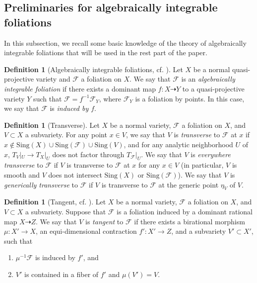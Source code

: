 \documentclass[11pt]{amsart}
\numberwithin{equation}{section}
\newcommand{\Ff}{\mathcal{F}}
\newcommand{\Sing}{\mathrm{Sing}}
\theoremstyle{definition}
\newtheorem{defn}[thm]{Definition}
\theoremstyle{definition}
\theoremstyle{definition}
\begin{document}
\subsection{Preliminaries for algebraically integrable foliations}\label{subsec: ai foliation}

In this subsection, we recall some basic knowledge of the theory of algebraically integrable foliations that will be used in the rest part of the paper.

\begin{defn}[Algebraically integrable foliations, {cf. \cite[3.1]{ACSS21}}]\label{defn: algebraically integrable}
Let $X$ be a normal quasi-projective variety and $\Ff$ a foliation on $X$. We say that $\Ff$ is an \emph{algebraically integrable foliation} if there exists a dominant map $f: X\dashrightarrow Y$ to a quasi-projective variety $Y$ such that $\Ff=f^{-1}\Ff_Y$, where $\Ff_Y$ is a foliation by points. In this case, we say that $\Ff$ is \emph{induced by $f$}.
\end{defn}


\begin{defn}[Transverse]
  Let $X$ be a normal variety, $\Ff$ a foliation on $X$, and $V\subset X$ a subvariety. For any point $x\in V$, we say that $V$ is \emph{transverse} to $\Ff$ at $x$ if $x\not\in\Sing(X)\cup\Sing(\Ff)\cup\Sing(V)$, and for any analytic neighborhood $U$ of $x$, $T_{V}|_U\rightarrow T_X|_U$ does not factor through $T_{\Ff}|_U$. We say that $V$ is \emph{everywhere transverse} to $\Ff$ if $V$ is transverse to $\Ff$ at $x$ for any $x\in V$ (in particular, $V$ is smooth and $V$ does not intersect $\Sing(X)$ or $\Sing(\Ff)$). We say that $V$ is \emph{generically transverse} to $\Ff$ if $V$ is transverse to $\Ff$ at the generic point $\eta_V$ of $V$.
\end{defn}

\begin{defn}[Tangent, {cf. \cite[Section 3.4]{ACSS21}}]\label{defn: tangent to foliation}
 Let $X$ be a normal variety, $\Ff$ a foliation on $X$, and $V\subset X$ a subvariety. Suppose that $\Ff$ is a foliation induced by a dominant rational map $X\dashrightarrow Z$. We say that $V$ is \emph{tangent} to $\Ff$ if there exists a birational morphism $\mu: X'\rightarrow X$, an equi-dimensional contraction $f': X'\rightarrow Z$, and a subvariety $V'\subset X'$, such that
    \begin{enumerate}
    \item $\mu^{-1}\Ff$ is induced by $f'$, and
        \item $V'$ is contained in a fiber of $f'$ and $\mu(V')=V$.
    \end{enumerate}
\end{defn}
\end{document}
